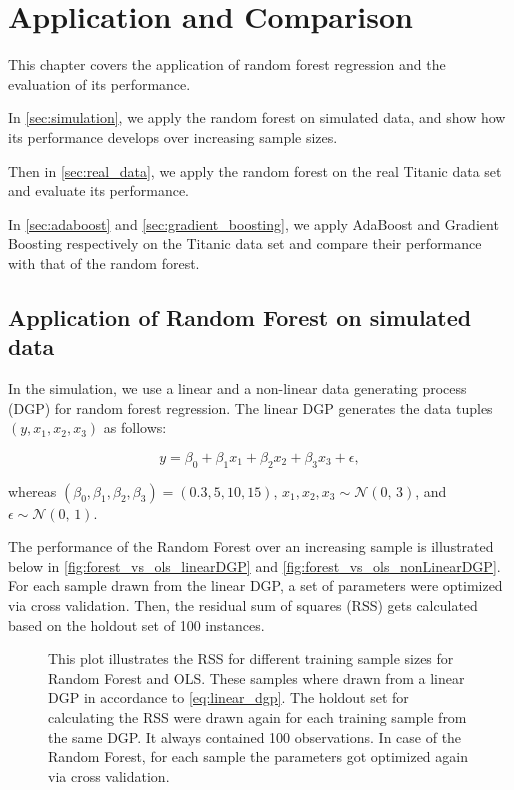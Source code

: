 \section{Application and Comparison}
This chapter covers the application of random forest regression and the evaluation of its performance.

In \autoref{sec:simulation}, we apply the random forest on simulated data, 
and show how its performance develops over increasing sample sizes.

Then in \autoref{sec:real_data}, we apply the random forest on the real Titanic data set \cite{titanicData}
and evaluate its performance.

In \ref{sec:adaboost} and \ref{sec:gradient_boosting}, we apply AdaBoost and Gradient
Boosting respectively on the Titanic data set and  compare their performance with that of the random forest.

\subsection{Application of Random Forest on simulated data}
\label{sec:simulation}

In the simulation, we use a linear and a non-linear data generating process (DGP) for random forest regression.
The linear DGP generates the data tuples \( (y, x_{1}, x_{2}, x_{3}) \) as follows:

\begin{equation}\label{eq:linear_dgp}
    y = \beta_{0} + \beta_{1} x_{1} + \beta_{2} x_{2} + \beta_{3} x_{3} + \epsilon,
\end{equation}

whereas \( (\beta_{0}, \beta_{1}, \beta_{2}, \beta_{3}) = (0.3, 5, 10, 15) \),
\( x_{1}, x_{2}, x_{3} \sim \mathcal{N}(0,\,3) \), and \( \epsilon \sim \mathcal{N}(0,\,1) \).

The performance of the Random Forest over an increasing sample is illustrated
below in \autoref{fig:forest_vs_ols_linearDGP} and \autoref{fig:forest_vs_ols_nonLinearDGP}.
For each sample drawn from the linear DGP, a set of parameters
were optimized via cross validation. Then, the residual sum of squares (RSS) gets calculated
based on the holdout set of 100 instances.

\begin{figure}
    \captionsetup{format=plain}
    \caption
        {This plot illustrates the RSS for different training sample sizes for Random Forest and OLS.
        These samples where drawn from a linear DGP in accordance to \autoref{eq:linear_dgp}.
        The holdout set for calculating the RSS were drawn again for each training sample from the same DGP.
        It always contained 100 observations. In case of the Random Forest, for each sample the parameters
        got optimized again via cross validation.
        }
    \label{fig:forest_vs_ols_linearDGP}
\end{figure}

